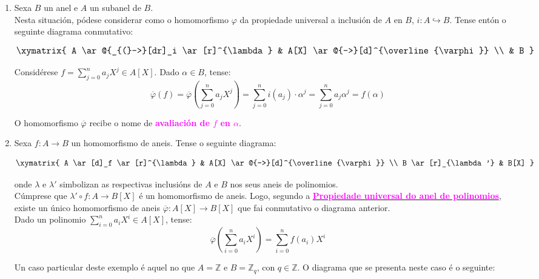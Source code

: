 \documentclass[twoside]{report}
\newcommand{\magbf}[1]{\textcolor{magenta}{\textbf{#1}}} %
\theoremstyle{mystyle}
\begin{document}
\begin{enumerate}
    \item Sexa $B$ un anel e $A$ un subanel de $B$.\\
    
    Nesta situación, pódese considerar como o homomorfismo $\varphi$ da propiedade universal a inclusión de $A$ en $B$, $i: A \hookrightarrow B$. Tense entón o seguinte diagrama conmutativo:

$$
     \large \xymatrix{
        A \ar@{_{(}->}[dr]_i \ar[r]^{\lambda} & A[X] \ar@{-->}[d]^{\overline{\varphi}} \\
          & B
    }    
$$

\vspace{3mm}

Considérese $f = \displaystyle \sum_{j=0}^{n}{a_{j}X^{j}} \in A[X]$. Dado $\alpha \in B$, tense:
$$\overline{\varphi}(f) = \overline{\varphi}\left(\overset{n}{\underset{j=0}{\sum}}a_{j}X^{j}\right) = \displaystyle \sum_{j=0}^{n}{i(a_{j}) \cdot \alpha^{j}} = \displaystyle \sum_{j=0}^{n}{a_{j}\alpha^{j}} = f(\alpha)$$

O homomorfismo $\overline{\varphi}$ recibe o nome de \magbf{avaliación de $f$ en $\alpha$}.\\

\item Sexa $f: A \longrightarrow B$ un homomorfismo de aneis. Tense o seguinte diagrama:

$$
     \large \xymatrix{
        A \ar[d]_f \ar[r]^{\lambda} & A[X] \ar@{-->}[d]^{\overline{\varphi}} \\
        B \ar[r]_{\lambda '} & B[X]
    }    
$$

onde $\lambda$ e $\lambda '$ simbolizan as respectivas inclusións de $A$ e $B$ nos seus aneis de polinomios.\\

Cúmprese que $\lambda ' \circ f: A \longrightarrow B[X]$ é un homomorfismo de aneis. Logo, segundo a \hyperref[th2.8]{\magbf{Propiedade universal do anel de polinomios}}, existe un único homomorfismo de aneis $\overline{\varphi}: A[X] \longrightarrow B[X]$ que fai conmutativo o diagrama anterior.\\

Dado un polinomio $\displaystyle \sum_{i=0}^{n}{a_{i}X^{i}} \in A[X]$, tense:
$$\overline{\varphi}\left(\underset{i=0}{\overset{n}{\sum}}{a_{i}X^{i}}\right) = \displaystyle \sum_{i=0}^{n}f(a_{i})X^{i}$$

Un caso particular deste exemplo é aquel no que $A = \mathbb{Z}$ e $B = \mathbb{Z}_{q}$, con $q \in \mathbb{Z}$. O diagrama que se presenta neste caso é o seguinte:


\end{enumerate}
\end{document}
